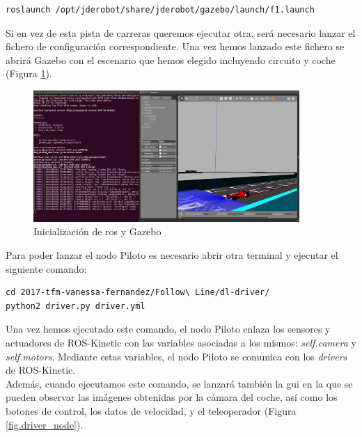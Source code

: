 \vspace{10pt}
\begin{lstlisting}
roslaunch /opt/jderobot/share/jderobot/gazebo/launch/f1.launch
\end{lstlisting}
\vspace{20pt}

Si en vez de esta pista de carreras queremos ejecutar otra, será necesario lanzar el fichero de configuración correspondiente. Una vez hemos lanzado este fichero se abrirá Gazebo con el escenario que hemos elegido incluyendo circuito y coche (Figura \ref{fig.roslaunch}).\\

\begin{figure}[H]
  \begin{center}
    \includegraphics[width=0.9\textwidth]{figures/Infraestructura/roslaunch.png}
		\caption{Inicialización de \acrshort{ros} y Gazebo}
		\label{fig.roslaunch}
		\end{center}
\end{figure}

Para poder lanzar el nodo Piloto es necesario abrir otra terminal y ejecutar el siguiente comando:\\

\vspace{10pt}
\begin{lstlisting}
cd 2017-tfm-vanessa-fernandez/Follow\ Line/dl-driver/
python2 driver.py driver.yml
\end{lstlisting}
\vspace{20pt}

Una vez hemos ejecutado este comando, el nodo Piloto enlaza los sensores y actuadores de ROS-Kinetic con las variables asociadas a los mismos: \textit{self.camera} y \textit{self.motors}. Mediante estas variables, el nodo Piloto se comunica con los \textit{drivers} de ROS-Kinetic.\\

Además, cuando ejecutamos este comando, se lanzará también la \acrfull{gui} en la que se pueden observar las imágenes obtenidas por la cámara del coche, así como los botones de control, los datos de velocidad, y el teleoperador (Figura \ref{fig.driver_node}).\\

